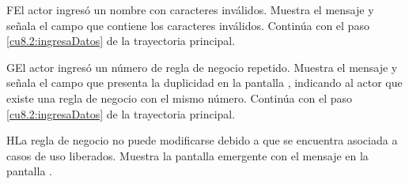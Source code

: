  \begin{UCtrayectoriaA}{F}{El actor ingresó un nombre con caracteres inválidos.}
    \UCpaso[\UCsist] Muestra el mensaje  y señala el campo que contiene los caracteres inválidos.
    \UCpaso[] Continúa con el paso \ref{cu8.2:ingresaDatos} de la trayectoria principal.
 \end{UCtrayectoriaA}
 \begin{UCtrayectoriaA}{G}{El actor ingresó un número de regla de negocio repetido.}
    \UCpaso[\UCsist] Muestra el mensaje  y señala el campo que presenta la duplicidad en la pantalla 
	    , indicando al actor que existe una regla de negocio con el mismo número.
    \UCpaso[] Continúa con el paso \ref{cu8.2:ingresaDatos} de la trayectoria principal.
 \end{UCtrayectoriaA}
 
 \begin{UCtrayectoriaA}{H}{La regla de negocio no puede modificarse debido a que se encuentra asociada a casos de uso liberados.}
    \UCpaso[\UCsist] Muestra la pantalla emergente con el mensaje  en la pantalla .
 \end{UCtrayectoriaA}
 
